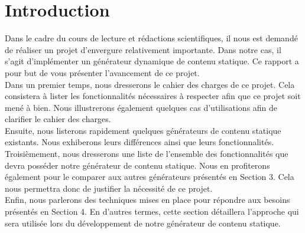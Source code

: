 \section{Introduction}

	Dans le cadre du cours de lecture et rédactions scientifiques, il nous est demandé de réaliser un projet d'envergure relativement importante. Dans notre cas, il s'agit d'implémenter un générateur dynamique de contenu statique. Ce rapport a pour but de vous présenter l'avancement de ce projet.\\
	
	Dans un premier temps, nous dresserons le cahier des charges de ce projet. Cela consistera à lister les fonctionnalités nécessaires à respecter afin que ce projet soit mené à bien. Nous illustrerons également quelques cas d'utilisations afin de clarifier le cahier des charges.\\
	
	Ensuite, nous listerons rapidement quelques générateurs de contenu statique existants. Nous exhiberons leurs différences ainsi que leurs fonctionnalités.\\
	
	Troisièmement, nous dresserons une liste de l'ensemble des fonctionnalités que devra posséder notre générateur de contenu statique. Nous en profiterons également pour le comparer aux autres générateurs présentés en Section 3. Cela nous permettra donc de justifier la nécessité de ce projet.\\
	
	Enfin, nous parlerons des techniques mises en place pour répondre aux besoins présentés en Section 4. En d'autres termes, cette section détaillera l'approche qui sera utilisée lors du développement de notre générateur de contenu statique.

	
